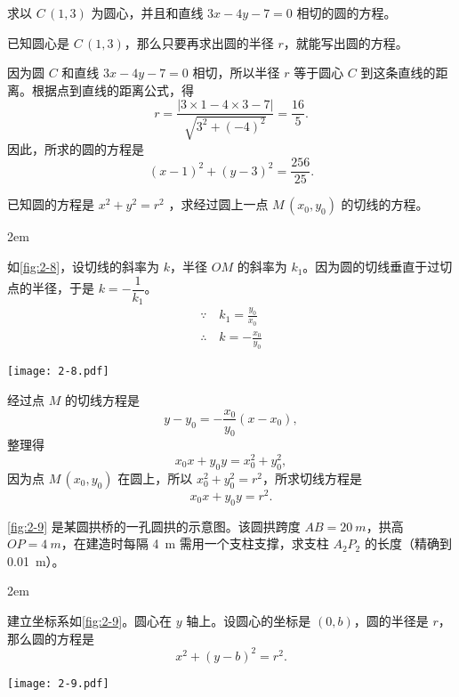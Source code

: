 \begin{example}
求以 $C\,(1,3)$ 为圆心，并且和直线 $3x-4y-7=0$ 相切的圆的方程。
\end{example}
\begin{solution}
  已知圆心是 $C\,(1,3)$，那么只要再求出圆的半径 $r$，就能写出圆的方程。

  因为圆 $C$ 和直线 $3x-4y-7=0$ 相切，所以半径 $r$ 等于圆心 $C$ 到这条直线的距离。根据点到直线的距离公式，得
  \[r=\frac{|3\times 1-4\times 3-7|}{\sqrt{3^2+(-4)^2}}=\frac{16}{5}.\]
  因此，所求的圆的方程是
  \[(x-1)^2+(y-3)^2=\frac{256}{25}.\]
\end{solution}

\begin{example}
  已知圆的方程是 $x^2+y^2=r^2$ ，求经过圆上一点 $M\,(x_0,y_0)$ 的切线的方程。
\end{example}
\noindent
\begin{minipage}{0.68\linewidth}\parindent2em
\begin{solution}
  如\cref{fig:2-8}，设切线的斜率为 $k$，半径 $OM$ 的斜率为 $k_1$。因为圆的切线垂直于过切点的半径，于是 $k=-\dfrac{1}{k_1}$。
  \begin{gather*}
    \because \quad k_1=\frac{y_0}{x_0}\\
    \therefore \quad k=-\frac{x_0}{y_0}
  \end{gather*}
\end{solution}
\end{minipage}\hfill
\begin{minipage}{0.27\linewidth}\centering
\begin{figurehere}
  \texttt{[image: 2-8.pdf]}
  \caption{}\label{fig:2-8}
\end{figurehere}
\end{minipage}

\medskip\noindent
经过点 $M$ 的切线方程是
  \[y-y_0=-\frac{x_0}{y_0}(x-x_0),\]
  整理得
  \[ x_0x+y_0y=x_0^2+y_0^2,\]
  因为点 $M\,(x_0,y_0)$ 在圆上，所以 $x_0^2+y_0^2=r^2$，所求切线方程是
  \[x_0x+y_0y=r^2.\]
\begin{example}
  \cref{fig:2-9} 是某圆拱桥的一孔圆拱的示意图。该圆拱跨度 $AB=\qty{20}{m}$，拱高 $OP=\qty{4}{m}$，在建造时每隔 \qty{4}{m} 需用一个支柱支撑，求支柱 $A_2P_2$ 的长度（精确到 \qty{0.01}{m}）。
\end{example}
\noindent
\begin{minipage}{0.5\linewidth}\parindent2em
\begin{solution}
建立坐标系如\cref{fig:2-9}。圆心在 $y$ 轴上。设圆心的坐标是 $(0,b)$，圆的半径是 $r$，那么圆的方程是
\[x^2+(y-b)^2=r^2.\]
\end{solution}
\end{minipage}\hfill
\begin{minipage}{0.45\linewidth}\centering
  \begin{figurehere}
    \texttt{[image: 2-9.pdf]}
    \caption{}\label{fig:2-9}
  \end{figurehere}
\end{minipage}

